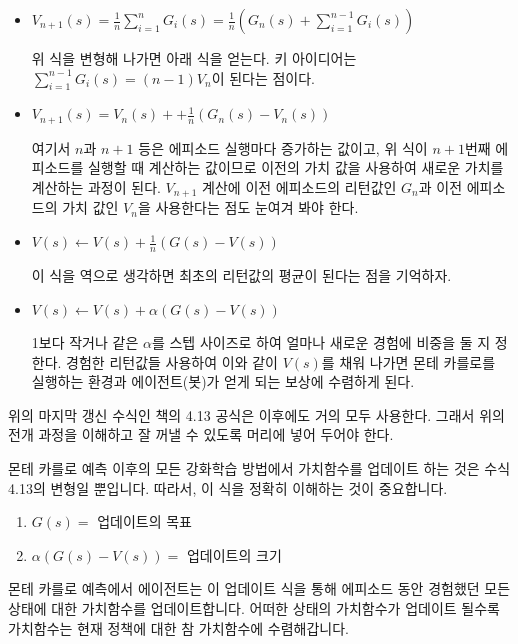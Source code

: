 \documentclass[ %
    a4paper,    %
    amsmath,    %
    itemph,     %
]{oblivoir}     %
\begin{document}
\begin{itemize}

\item $V_{n+1}(s) = \frac{1}{n} \sum_{i=1}^n G_i(s) = \frac{1}{n}(G_n(s) + \sum_{i=1}^{n-1} G_i(s))$

위 식을 변형해 나가면 아래 식을 얻는다. 키 아이디어는 $\sum_{i=1}^{n-1} G_i(s) = (n-1)V_n$이 된다는 점이다.

\item $V_{n+1}(s) = V_n(s) ++ \frac{1}{n}(G_n(s) - V_n(s))$

여기서 $n$과 $n+1$ 등은 에피소드 실행마다 증가하는 값이고, 위 식이 $n+1$번째 에피소드를 실행할 때 
계산하는 값이므로 이전의 가치 값을 사용하여 새로운 가치를 계산하는 과정이 된다. 
$V_{n+1}$ 계산에 이전 에피소드의 리턴값인 $G_n$과 이전 에피소드의 가치 값인 $V_n$을 사용한다는 점도 눈여겨 봐야 한다. 

\item $V(s) \leftarrow V(s) + \frac{1}{n}(G(s) - V(s))$

이 식을 역으로 생각하면 최초의 리턴값의 평균이 된다는 점을 기억하자. 

\item $V(s) \leftarrow V(s) + \alpha(G(s) - V(s))$

1보다 작거나 같은 $\alpha$를 스텝 사이즈로 하여 얼마나 새로운 경험에 비중을 둘 지 정한다. 
경험한 리턴값들 사용하여 이와 같이 $V(s)$를 채워 나가면 몬테 카를로를 실행하는 
환경과 에이전트(봇)가 얻게 되는 보상에 수렴하게 된다. 
\end{itemize}

위의 마지막 갱신 수식인 책의 4.13 공식은 이후에도 거의 모두 사용한다. 그래서 위의 
전개 과정을 이해하고 잘 꺼낼 수 있도록 머리에 넣어 두어야 한다. 

\begin{tcolorbox}[title=수식 4.13]
몬테 카를로 예측 이후의 모든 강화학습 방법에서 가치함수를 업데이트 하는 것은 수식 
4.13의 변형일 뿐입니다. 따라서, 이 식을 정확히 이해하는 것이 중요합니다. 

\begin{enumerate}
\item $G(s)=$ 업데이트의 목표 
\item $\alpha(G(s) - V(s))= $ 업데이트의 크기
\end{enumerate}

몬테 카를로 예측에서 에이전트는 이 업데이트 식을 통해 에피소드 동안 경험했던 
모든 상태에 대한 가치함수를 업데이트합니다. 어떠한 상태의 가치함수가 업데이트 될수록 
가치함수는 현재 정책에 대한 참 가치함수에 수렴해갑니다. 

\end{tcolorbox}
\end{document}
